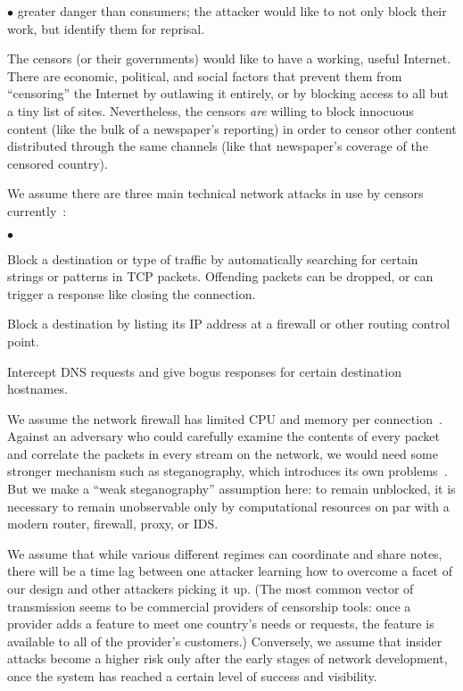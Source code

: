 \documentclass{llncs}
\newenvironment{tightlist}{\begin{list}{$\bullet$}{
  \setlength{\itemsep}{0mm}
    \setlength{\parsep}{0mm}
    }}{\end{list}}
\begin{document}
\begin{tightlist}
  greater danger than consumers; the attacker would like to not only block
  their work, but identify them for reprisal.
\item The censors (or their governments) would like to have a working, useful
  Internet. There are economic, political, and social factors that prevent
  them from ``censoring'' the Internet by outlawing it entirely, or by
  blocking access to all but a tiny list of sites.
  Nevertheless, the censors {\it are} willing to block innocuous content
  (like the bulk of a newspaper's reporting) in order to censor other content
  distributed through the same channels (like that newspaper's coverage of
  the censored country).
\end{tightlist}

We assume there are three main technical network attacks in use by censors
currently~\cite{clayton:pet2006}:

\begin{tightlist}
\item Block a destination or type of traffic by automatically searching for
  certain strings or patterns in TCP packets.  Offending packets can be
  dropped, or can trigger a response like closing the
  connection.
\item Block a destination by listing its IP address at a
  firewall or other routing control point.
\item Intercept DNS requests and give bogus responses for certain
  destination hostnames.
\end{tightlist}

We assume the network firewall has limited CPU and memory per
connection~\cite{clayton:pet2006}.  Against an adversary who could carefully
examine the contents of every packet and correlate the packets in every
stream on the network, we would need some stronger mechanism such as
steganography, which introduces its own
problems~\cite{active-wardens,tcpstego}.  But we make a ``weak
steganography'' assumption here: to remain unblocked, it is necessary to
remain unobservable only by computational resources on par with a modern
router, firewall, proxy, or IDS.

We assume that while various different regimes can coordinate and share
notes, there will be a time lag between one attacker learning how to overcome
a facet of our design and other attackers picking it up.  (The most common
vector of transmission seems to be commercial providers of censorship tools:
once a provider adds a feature to meet one country's needs or requests, the
feature is available to all of the provider's customers.)  Conversely, we
assume that insider attacks become a higher risk only after the early stages
of network development, once the system has reached a certain level of
success and visibility.
\end{document}
